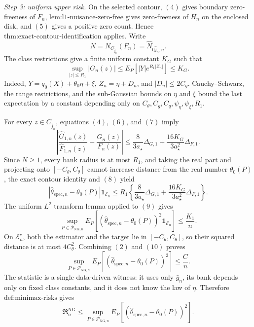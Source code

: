 \emph{Step 3: uniform upper risk.}
On the selected contour, \((4)\) gives boundary zero-freeness of \(F_n\), \(\text{lem:l1-nuisance-zero-free}\) gives zero-freeness of \(H_n\) on the enclosed disk, and \((5)\) gives a positive zero count. Hence \(\text{thm:exact-contour-identification}\) applies. Write
\[
 N=N_{C_{\widehat j_n}}(F_n)=\widehat N_{0\widehat j_n,n}.
\]
The class restrictions give a finite uniform constant \(K_G\) such that
\[
 \sup_{|z|\le R_1}|G_n(z)|
 \le E_P[|Y|e^{R_1|Z_n|}]
 \le K_G. \tag{7}
\]
Indeed, \(Y=q_0(X)+\theta_0\eta+\xi\), \(Z_n=\eta+D_n\), and \(|D_n|\le2C_g\). Cauchy--Schwarz, the range restrictions, and the sub-Gaussian bounds on \(\eta\) and \(\xi\) bound the last expectation by a constant depending only on \(C_{\theta},C_g,C_q,\psi_{\eta},\psi_{\xi},R_1\).

For every \(z\in C_{\widehat j_n}\), equations \((4)\), \((6)\), and \((7)\) imply
\[
 \left|
  \frac{\widehat G_{1,n}(z)}{\widehat F_{1,n}(z)}
  -\frac{G_n(z)}{F_n(z)}
 \right|
 \le
 \frac{8}{3a_{\star}}\Delta_{G,1}
 +\frac{16K_G}{3a_{\star}^2}\Delta_{F,1}. \tag{8}
\]
Since \(N\ge1\), every bank radius is at most \(R_1\), and taking the real part and projecting onto \([-C_{\theta},C_{\theta}]\) cannot increase distance from the real number \(\theta_0(P)\), the exact contour identity and \((8)\) yield
\[
 |\widehat\theta_{\mathrm{spec},n}-\theta_0(P)|\mathbf 1_{\mathcal E_n}
 \le R_1\left\{
   \frac{8}{3a_{\star}}\Delta_{G,1}
   +\frac{16K_G}{3a_{\star}^2}\Delta_{F,1}
 \right\}. \tag{9}
\]
The uniform \(L^2\) transform lemma applied to \((9)\) gives
\[
 \sup_{P\in\mathcal P_{\mathrm{NG},n}}
 E_P\!\left[(\widehat\theta_{\mathrm{spec},n}-\theta_0(P))^2\mathbf 1_{\mathcal E_n}\right]
 \le\frac{K_1}{n}. \tag{10}
\]
On \(\mathcal E_n^c\), both the estimator and the target lie in \([-C_{\theta},C_{\theta}]\), so their squared distance is at most \(4C_{\theta}^2\). Combining \((2)\) and \((10)\) proves
\[
 \sup_{P\in\mathcal P_{\mathrm{NG},n}}
 E_P[(\widehat\theta_{\mathrm{spec},n}-\theta_0(P))^2]
 \le\frac Cn. \tag{11}
\]
The statistic is a single data-driven witness: it uses only \(\bar g_n\), its bank depends only on fixed class constants, and it does not know the law of \(\eta\). Therefore \(\text{def:minimax-risks}\) gives
\[
 \mathfrak R_n^{\mathrm{NG}}
 \le\sup_{P\in\mathcal P_{\mathrm{NG},n}}
 E_P[(\widehat\theta_{\mathrm{spec},n}-\theta_0(P))^2]. \tag{12}
\]

